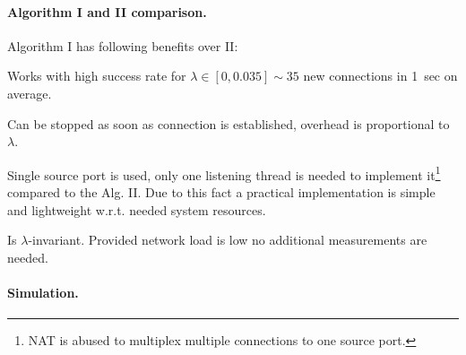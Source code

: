 \documentclass[twoside]{article}
\begin{document}
\begin{multicols}{2}
\paragraph{Algorithm I and II comparison.} 
Algorithm I has following benefits over II:
\begin{compactitem}
 \item Works with high success rate for $\lambda \in [0, 0.035] \sim 35$ new connections in 1~sec on average.
 \item Can be stopped as soon as connection is established, overhead is proportional to~$\lambda$.
 \item Single source port is used, only one listening thread is needed to implement
it\footnote{NAT is abused to multiplex multiple connections to one source port.} compared to the Alg. II.
Due to this fact a practical implementation is simple and lightweight w.r.t. needed system resources.
 \item Is $\lambda$-invariant. Provided network load is low no additional measurements are needed.
\end{compactitem}

\paragraph{Simulation.}


\end{multicols}
\end{document}

